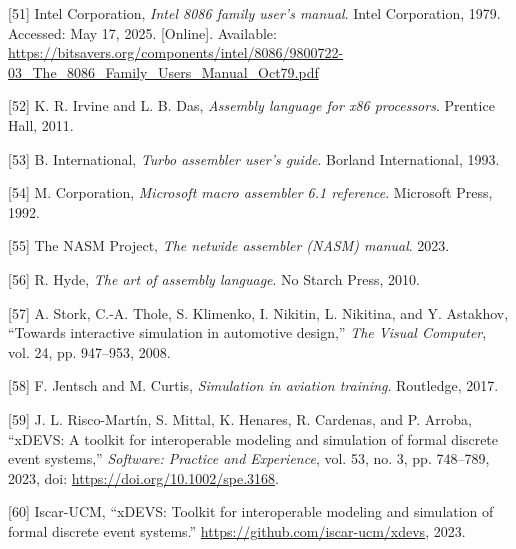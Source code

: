 \documentclass[12pt,oneside]{templates/unerthesis}
\newcommand{\CSLLeftMargin}[1]{#1} %
\newcommand{\CSLRightInline}[1]{#1} %
\newlength{\cslhangindent}
\newenvironment{CSLReferences}[2] %
 {\setlength{\parindent}{0pt}%
  \setlength{\leftskip}{#1 pt\relax}%
  \setlength{\parskip}{#2 pt\relax}%
  \everypar{\setlength{\hangindent}{\cslhangindent}}}
 {\par}
\begin{document}
\begin{CSLReferences}{0}{0}
\leavevmode{}%
\CSLLeftMargin{{[}51{]} }%
\CSLRightInline{Intel Corporation, \emph{Intel 8086 family user's manual}. Intel Corporation, 1979. Accessed: May 17, 2025. {[}Online{]}. Available: \url{https://bitsavers.org/components/intel/8086/9800722-03_The_8086_Family_Users_Manual_Oct79.pdf}}

\leavevmode{}%
\CSLLeftMargin{{[}52{]} }%
\CSLRightInline{K. R. Irvine and L. B. Das, \emph{Assembly language for x86 processors}. Prentice Hall, 2011.}

\leavevmode{}%
\CSLLeftMargin{{[}53{]} }%
\CSLRightInline{B. International, \emph{Turbo assembler user's guide}. Borland International, 1993.}

\leavevmode{}%
\CSLLeftMargin{{[}54{]} }%
\CSLRightInline{M. Corporation, \emph{Microsoft macro assembler 6.1 reference}. Microsoft Press, 1992.}

\leavevmode{}%
\CSLLeftMargin{{[}55{]} }%
\CSLRightInline{The NASM Project, \emph{The netwide assembler (NASM) manual}. 2023.}

\leavevmode{}%
\CSLLeftMargin{{[}56{]} }%
\CSLRightInline{R. Hyde, \emph{The art of assembly language}. No Starch Press, 2010.}

\leavevmode{}%
\CSLLeftMargin{{[}57{]} }%
\CSLRightInline{A. Stork, C.-A. Thole, S. Klimenko, I. Nikitin, L. Nikitina, and Y. Astakhov, {``Towards interactive simulation in automotive design,''} \emph{The Visual Computer}, vol. 24, pp. 947--953, 2008.}

\leavevmode{}%
\CSLLeftMargin{{[}58{]} }%
\CSLRightInline{F. Jentsch and M. Curtis, \emph{Simulation in aviation training}. Routledge, 2017.}

\leavevmode{}%
\CSLLeftMargin{{[}59{]} }%
\CSLRightInline{J. L. Risco-Martín, S. Mittal, K. Henares, R. Cardenas, and P. Arroba, {``xDEVS: A toolkit for interoperable modeling and simulation of formal discrete event systems,''} \emph{Software: Practice and Experience}, vol. 53, no. 3, pp. 748--789, 2023, doi: \url{https://doi.org/10.1002/spe.3168}.}

\leavevmode{}%
\CSLLeftMargin{{[}60{]} }%
\CSLRightInline{Iscar-UCM, {``xDEVS: Toolkit for interoperable modeling and simulation of formal discrete event systems.''} \url{https://github.com/iscar-ucm/xdevs}, 2023.}


\end{CSLReferences}
\end{document}
